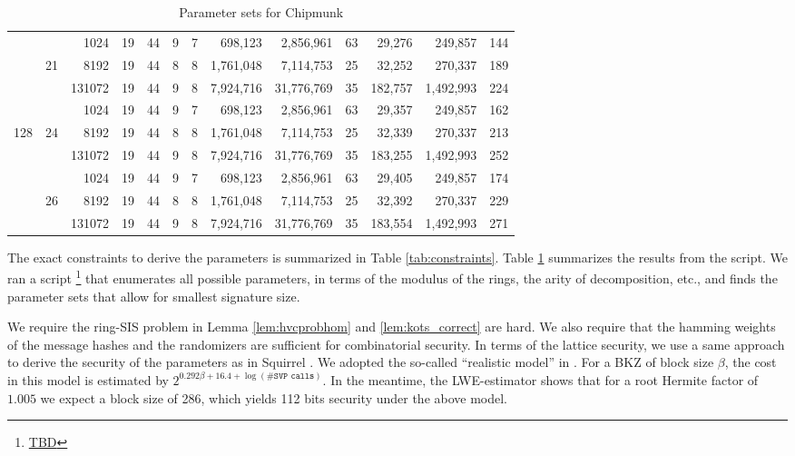 \begin{table}
\begin{tabular}{|c|c|r||c|c||c|c|r|r||c||r|r||c|}
    &       &   1024 &         19 &        44 &          9 &       7 &        698,123 &  2,856,961 &    63 &       29,276 &   249,857 & 144 \\\cline{3-13}
    &    21 &   8192 &         19 &        44 &          8 &       8 &      1,761,048 &  7,114,753 &    25 &       32,252 &   270,337 & 189 \\\cline{3-13}
    &       & 131072 &         19 &        44 &          9 &       8 &      7,924,716 & 31,776,769 &    35 &      182,757 & 1,492,993 & 224 \\\cline{2-13}

    &       &   1024 &         19 &        44 &          9 &       7 &        698,123 &  2,856,961 &    63 &       29,357 &   249,857 & 162 \\\cline{3-13}
128 &    24 &   8192 &         19 &        44 &          8 &       8 &      1,761,048 &  7,114,753 &    25 &       32,339 &   270,337 & 213 \\\cline{3-13}
    &       & 131072 &         19 &        44 &          9 &       8 &      7,924,716 & 31,776,769 &    35 &      183,255 & 1,492,993 & 252 \\\cline{2-13}

    &       &   1024 &         19 &        44 &          9 &       7 &        698,123 &  2,856,961 &    63 &       29,405 &   249,857 & 174 \\\cline{3-13}
    &    26 &   8192 &         19 &        44 &          8 &       8 &      1,761,048 &  7,114,753 &    25 &       32,392 &   270,337 & 229 \\\cline{3-13}
    &       & 131072 &         19 &        44 &          9 &       8 &      7,924,716 & 31,776,769 &    35 &      183,554 & 1,492,993 & 271 \\\hline
  \end{tabular}\label{tab:param}
  \caption{Parameter sets for Chipmunk}
\end{table}

The exact constraints to derive the parameters is summarized in Table \ref{tab:constraints}.
Table \ref{tab:param} summarizes the results from the script. 
We ran a script \footnote{\label{fn:github}\url{TBD}}
that enumerates all possible 
parameters, in terms of the modulus of the rings, the arity of decomposition, etc., and finds the parameter sets that
allow for smallest signature size.

We require the ring-SIS problem in Lemma \ref{lem:hvcprobhom} and \ref{lem:kots_correct} are hard. 
We also require that the hamming weights of the message hashes and the randomizers are sufficient for combinatorial security.
In terms of the lattice security, we use a same approach to derive the security of the parameters as in Squirrel \cite{CCS:FleSimZha22}.
We adopted the so-called ``realistic model'' in \cite{DBLP:conf/uss/AlkimDPS16}.
For a BKZ of block size $\beta$, the cost in this model is estimated by
$2^{0.292\beta+16.4+\log(\#\texttt{SVP calls})}$. 
In the meantime, the LWE-estimator \cite{DBLP:journals/jmc/AlbrechtPS15}
shows that for a root Hermite factor of $1.005$ we expect a block size of 286, which yields 112 bits security under the above model. 

